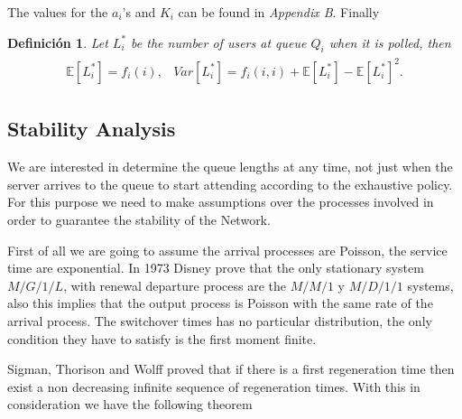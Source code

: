 \documentclass{article}
\newtheorem{Def}{Definición}
\newcommand{\esp}{\mathbb{E}}
\begin{document}
The values for the $a_{i}$'s and $K_{i}$ can be found in \textit{Appendix B}. Finally 

\begin{Def}
Let $L_{i}^{*}$ be the number of users at queue $Q_{i}$ when it is polled, then
\begin{eqnarray}
\begin{array}{cc}
\esp\left[L_{i}^{*}\right]=f_{i}\left(i\right), &
Var\left[L_{i}^{*}\right]=f_{i}\left(i,i\right)+\esp\left[L_{i}^{*}\right]-\esp\left[L_{i}^{*}\right]^{2}.
\end{array}
\end{eqnarray}
\end{Def}

%
\subsection{Stability Analysis}
%

We are interested in determine the queue lengths at any time, not just when the server arrives to the queue to start attending according to the exhaustive policy. For this purpose we need to make assumptions over the processes involved in order to guarantee the stability of the Network.



First of all we are going to assume the arrival processes are Poisson, the service time are exponential. In 1973 Disney \cite{Disney} prove that the only stationary system $M/G/1/L$, with renewal departure process are the $M/M/1$ y $M/D/1/1$ systems, also this implies that the output process is Poisson with the same rate of the arrival process. The switchover times has no particular distribution, the only condition they have to satisfy is the first moment finite.

Sigman, Thorison and Wolff \cite{Sigman2} proved that if there is a first regeneration time then exist a non decreasing infinite sequence of regeneration times. With this in consideration we have the following theorem 
\end{document}
